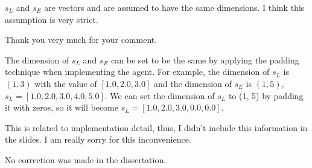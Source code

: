 
\begin{revcomment}
  $s_L$ and $s_E$ are vectors and are assumed to have the same dimensions.
  I think this assumption is very strict.
\end{revcomment}

\begin{revresponse}
  Thank you very much for your comment.

  The dimension of $s_L$ and $s_E$ can be set to be the same by applying the padding technique when implementing the agent.
  For example, the dimension of $s_L$ is $(1, 3)$ with the value of $[1.0, 2.0, 3.0]$ and the dimension of $s_E$ is $(1, 5)$, $s_L = [1.0, 2.0, 3.0, 4.0, 5.0]$.
  We can set the dimension of $s_L$ to (1, 5) by padding it with zeros, so it will become $s_L=[1.0, 2.0, 3.0, 0.0, 0.0]$.

  This is related to implementation detail, thus, I didn't include this information in the slides.
  I am really sorry for this inconvenience.

  \begin{correction}
    No correction was made in the dissertation.
  \end{correction}
\end{revresponse}






